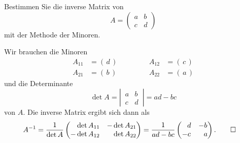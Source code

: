 Bestimmen Sie die inverse Matrix von
\[
A
=
\begin{pmatrix}
a&b\\
c&d
\end{pmatrix}
\]
mit der Methode der Minoren.

\begin{loesung}
Wir brauchen die Minoren
\[
\begin{aligned}
A_{11}&= (\,d\,) &&\qquad&
A_{12}&= (\,c\,) \\
A_{21}&= (\,b\,) &&\qquad&
A_{22}&= (\,a\,)
\end{aligned}
\]
und die Determinante 
\[
\det A
=
\left|\,\begin{matrix}
a&b\\
c&d
\end{matrix}
\,\right|
=
ad-bc
\]
von $A$.
Die inverse Matrix ergibt sich dann als
\begin{align*}
A^{-1}
&=
\frac{1}{\det A}
\begin{pmatrix}
\phantom{-}\det A_{11} & -\det A_{21} \\
-\det A_{12} & \phantom{-}\det A_{22}
\end{pmatrix}
=
\frac{1}{ad-bc}
\begin{pmatrix}
\phantom{-}d &          - b \\
         - c & \phantom{-}a
\end{pmatrix}.
\qedhere
\end{align*}
\end{loesung}
